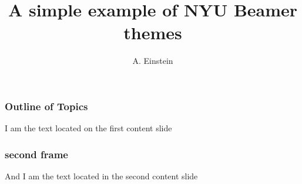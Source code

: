 \documentclass{beamer}
\title{A simple example of NYU Beamer themes}
\author{A. Einstein}
\begin{document}
\begin{frame}
\titlepage
\end{frame}

\begin{frame}
    \frametitle{Outline of Topics}
I am the text located on the first content slide
\end{frame}

\begin{frame}
    \frametitle{second frame}
And I am the text located in the second content slide
\end{frame}
\end{document}
